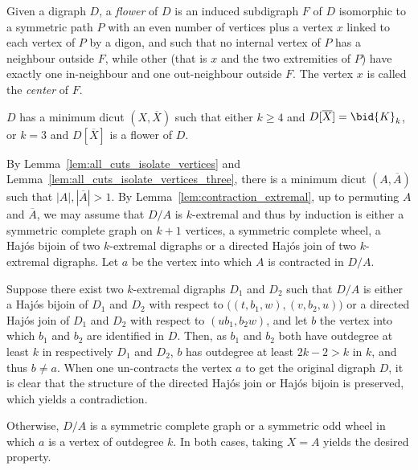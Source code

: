     Given a digraph  $D$, a \emph{flower} of $D$ is an induced subdigraph $F$ of $D$ isomorphic to a symmetric path $P$ with an even number of vertices plus a vertex $x$ linked to each vertex of $P$ by a digon, and such that no internal vertex of $P$ has a neighbour outside $F$, while other (that is $x$ and the two extremities of $P$) have exactly one in-neighbour and one out-neighbour outside $F$. The  vertex $x$ is called the \emph{center} of $F$.

    \begin{claim}
    $D$ has a minimum dicut $(X, \overline{X})$ such that either $k \geq 4$ and $D[\overline{X}] = \bid{K}_k$, or $k=3$ and $D[\overline{X}]$ is a flower of $D$.
    \end{claim}

    \begin{proofclaim}    
        By  Lemma~\ref{lem:all_cuts_isolate_vertices} and Lemma~\ref{lem:all_cuts_isolate_vertices_three}, there is a minimum dicut $(A,\overline{A})$  such that $|A|, |\overline{A}| > 1$. 
        By Lemma~\ref{lem:contraction_extremal}, up to permuting $A$ and $\overline{A}$, 
        we may assume that $D / A$ is $k$-extremal and thus by induction is either a symmetric complete graph on $k+1$ vertices, a symmetric complete wheel, a Haj\'os bijoin of two $k$-extremal digraphs or a directed Haj\'os  join of two $k$-extremal digraphs.   
        Let $a$ be the vertex into which $A$ is contracted in $D / A$.
        
        Suppose there exist two $k$-extremal digraphs $D_1$ and $D_2$ such that $D / A$ is either a Haj\'os bijoin of $D_1$ and $D_2$ with respect to $\big((t,b_1,w), (v,b_2, u)\big)$ or a directed Haj\'os  join of $D_1$ and $D_2$ with respect to $(ub_1, b_2w)$, and let $b$ the vertex into which $b_1$ and $b_2$ are identified in $D$. Then, as $b_1$ and $b_2$ both have outdegree at least $k$ in respectively $D_1$ and $D_2$, $b$ has outdegree at least $2k-2 > k$ in $k$, and thus $b \neq a$. When one un-contracts the vertex $a$ to get the original digraph $D$, it is clear that the structure of the directed Haj\'os join or Haj\'os bijoin is preserved, which yields a contradiction.
        
        Otherwise, $D/A$ is a symmetric complete graph or a symmetric odd wheel in which $a$ is a vertex of outdegree $k$. In both cases, taking $X = A$ yields the desired property. %
    \end{proofclaim}
    

